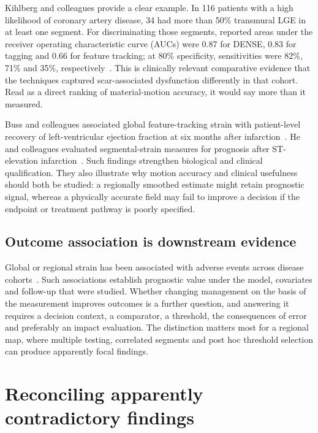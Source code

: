 Kihlberg and colleagues provide a clear example. In 116 patients with a high likelihood of coronary artery disease, 34 had more than 50\% transmural LGE in at least one segment. For discriminating those segments, reported areas under the receiver operating characteristic curve (AUCs) were 0.87 for DENSE, 0.83 for tagging and 0.66 for feature tracking; at 80\% specificity, sensitivities were 82\%, 71\% and 35\%, respectively~\cite{kihlberg2020clinical}. This is clinically relevant comparative evidence that the techniques captured scar-associated dysfunction differently in that cohort. Read as a direct ranking of material-motion accuracy, it would say more than it measured.

Buss and colleagues associated global feature-tracking strain with patient-level recovery of left-ventricular ejection fraction at six months after infarction~\cite{buss2015}. He and colleagues evaluated segmental-strain measures for prognosis after ST-elevation infarction~\cite{he2024}. Such findings strengthen biological and clinical qualification. They also illustrate why motion accuracy and clinical usefulness should both be studied: a regionally smoothed estimate might retain prognostic signal, whereas a physically accurate field may fail to improve a decision if the endpoint or treatment pathway is poorly specified.

\subsection{Outcome association is downstream evidence}

Global or regional strain has been associated with adverse events across disease cohorts~\cite{mangion2019,chadalavada2024}. Such associations establish prognostic value under the model, covariates and follow-up that were studied. Whether changing management on the basis of the measurement improves outcomes is a further question, and answering it requires a decision context, a comparator, a threshold, the consequences of error and preferably an impact evaluation. The distinction matters most for a regional map, where multiple testing, correlated segments and post hoc threshold selection can produce apparently focal findings.

\section{Reconciling apparently contradictory findings}\label{sec:reconcile}

